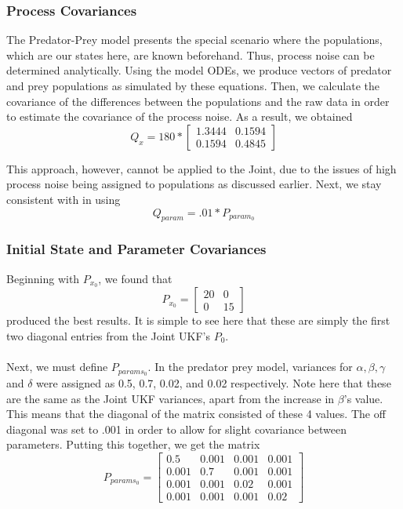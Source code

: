 \documentclass{article}
\begin{document}
\subsubsection{Process Covariances}
The Predator-Prey model presents the special scenario where the populations, which are our states here, are known beforehand. Thus, process noise can be determined analytically. Using the model ODEs, we produce vectors of predator and prey populations as simulated by these equations. Then, we calculate the covariance of the differences between the populations and the raw data in order to estimate the covariance of the process noise. As a result, we obtained
\begin{equation}
Q_{x} = 180 * \begin{bmatrix} 1.3444 & 0.1594\\ 0.1594 & 0.4845\end{bmatrix}
\end{equation}

This approach, however, cannot be applied to the Joint, due to the issues of high process noise being assigned to populations as discussed earlier. Next, we stay consistent with \cite{GoveHollingerDual} in using
\begin{equation}
 Q_{param} = .01 * P_{param_0} 
\end{equation}


\subsubsection{Initial State and Parameter Covariances}
Beginning with $P_{x_0}$, we found that
\begin{equation}
P_{x_0} = \begin{bmatrix}
20 & 0\\0 & 15\end{bmatrix}
\end{equation}
produced the best results. It is simple to see here that these are simply the first two diagonal entries from the Joint UKF's $P_0$. \\
\\
Next, we must define $P_{params_0}$. In the predator prey model, variances for $\alpha, \beta, \gamma$ and $\delta$ were assigned as 0.5, 0.7, 0.02, and 0.02 respectively. Note here that these are the same as the Joint UKF variances, apart from the increase in $\beta$'s value. This means that the diagonal of the matrix consisted of these 4 values. The off diagonal was set to .001 in order to allow for slight covariance between parameters. Putting this together, we get the matrix
\begin{equation}
P_{params_0} = \begin{bmatrix} 0.5 & 0.001 & 0.001 & 0.001 \\
                                0.001 & 0.7 & 0.001 & 0.001 \\
                                0.001 & 0.001 & 0.02 & 0.001 \\
                                0.001 & 0.001 & 0.001 & 0.02 \end{bmatrix}
\end{equation}
                                
\end{document}
